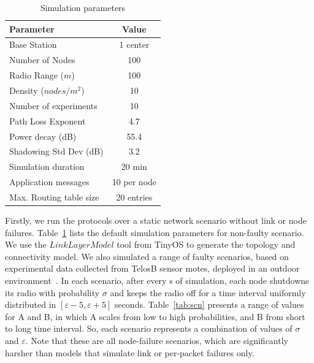 \begin{table}[!t]
\centering
\begin{tabular}{@{}lc@{}}
\toprule
\multicolumn{1}{l}{\textbf{Parameter}} & \textbf{Value} \\ \midrule
Base Station                           & 1 center       \\
Number of Nodes                        & 100            \\
Radio Range ($m$)                      & 100            \\
Density ($nodes/m^{2}$)                & 10             \\
Number of experiments                  & 10             \\
Path Loss Exponent                     & 4.7            \\
Power decay (dB)                       & 55.4           \\
Shadowing Std Dev (dB)                 & 3.2            \\
Simulation duration                    & 20 min            \\
Application messages                   & 10 per node \\
Max. Routing table size                & 20 entries \\
\bottomrule
\end{tabular}
\caption{Simulation parameters}
\label{tab:conf}
\end{table}

Firstly, we run the protocols over a static network scenario without link or node failures. Table~\ref{tab:conf} lists the default simulation parameters for non-faulty scenario. We use the $LinkLayerModel$ tool from TinyOS to generate the topology and connectivity model. We also simulated a range of faulty scenarios, based on experimental data collected from TelosB sensor motes, deployed in an outdoor environment~\cite{Baccour:2012}. In each scenario, after every \unit[60]{s} of simulation, each node shutdowns its radio with probability $\sigma$ and keeps the radio off for a time interval uniformly distributed in $[\varepsilon - 5, \varepsilon + 5]$ seconds. Table~\ref{tab:scn} presents a range of values for A and B, in which A scales from low to high probabilities, and B from short to long time interval. So, each scenario represents a combination of values of $\sigma$ and $\varepsilon$. Note that these are all node-failure scenarios, which are significantly harsher than models that simulate link or per-packet failures only.

